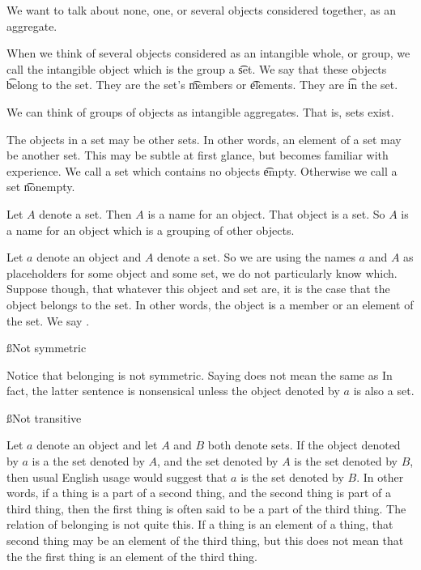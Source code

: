 

We want to talk about none, one, or several objects considered together, as an aggregate.


When we think of several objects considered as an intangible whole, or group, we call the intangible object which is the group a \t{set}.
We say that these objects \t{belong} to the set.
They are the set's \t{members} or \t{elements}.
They are \t{in} the set.
\begin{principle}
	We can think of groups of objects as intangible aggregates. That is, sets exist.
\end{principle}
The objects in a set may be other sets.
In other words, an element of a set may be another set.
This may be subtle at first glance, but becomes familiar with experience.
We call a set which contains no objects \t{empty}.
Otherwise we call a set \t{nonempty}.



Let $A$ denote a set.
Then $A$ is a name for an object.
That object is a set.
So $A$ is a name for an object which is a grouping of other objects.


Let $a$ denote an object and $A$ denote a set.
So we are using the names $a$ and $A$ as placeholders for some object and some set, we do not particularly know which.
Suppose though, that whatever this object and set are, it is the case that the object belongs to the set.
In other words, the object is a member or an element of the set.
We say .

\ss{Not symmetric}

Notice that belonging is not symmetric.
Saying  does not mean the same as 
In fact, the latter sentence is nonsensical unless the object denoted by $a$ is also a set.

\ss{Not transitive}

Let $a$ denote an object and let $A$ and $B$ both denote sets.
If the object denoted by $a$ is  a the set denoted by $A$, and the set denoted by $A$ is  the set denoted by $B$, then usual English usage would suggest that $a$ is  the set denoted by $B$.
In other words, if a thing is a part of a second thing, and the second thing is part of a third thing, then the first thing is often said to be a part of the third thing.
The relation of belonging is not quite this.
If a thing is an element of a thing, that second thing may be an element of the third thing, but this does not mean that the the first thing is an element of the third thing.

